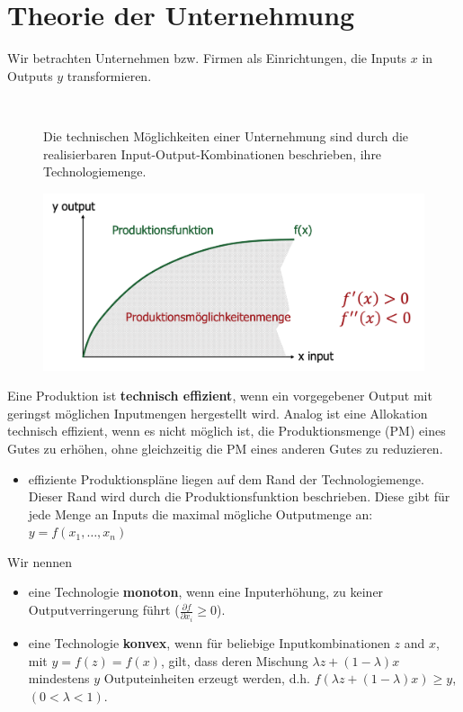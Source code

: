 \chapter{Theorie der Unternehmung}

Wir betrachten Unternehmen bzw. Firmen als Einrichtungen, die Inputs $x$ in Outputs $y$ transformieren.
\begin{figure}[htbp!]
	\begin{minipage}[t]{8cm} \vspace{0pt} ~\medskip
	
		 Die technischen Möglichkeiten einer Unternehmung sind durch die realisierbaren Input-Output-Kombinationen beschrieben, ihre Technologiemenge.
	\end{minipage}
	\hspace{0.25cm}
	\begin{minipage}[t]{4cm}\vspace{0.01pt}
		\includegraphics[scale=0.225]{img/technologiemenge}
	\end{minipage}
\end{figure} 

Eine Produktion ist \textbf{technisch effizient}, wenn ein vorgegebener Output mit geringst möglichen Inputmengen hergestellt wird. Analog ist eine Allokation technisch effizient, wenn es nicht möglich ist, die Produktionsmenge (PM) eines Gutes zu erhöhen, ohne gleichzeitig die PM eines anderen Gutes zu reduzieren.

\begin{itemize}
	\item effiziente Produktionspläne liegen auf dem Rand der Technologiemenge. Dieser Rand wird durch die Produktionsfunktion beschrieben. Diese gibt für jede Menge an Inputs die maximal mögliche Outputmenge an: $y = f(x_1, \dotsc, x_n)$
\end{itemize}

Wir nennen
\begin{itemize}
	\item eine Technologie \textbf{monoton}, wenn eine Inputerhöhung, zu keiner Outputverringerung führt ($\frac{\partial f}{\partial x_i} \geq 0$).
	\item eine Technologie \textbf{konvex}, wenn für beliebige Inputkombinationen $z$ and $x$, mit $y = f(z) = f(x)$, gilt, dass deren Mischung $\lambda z + (1-\lambda) x$ mindestens $y$ Outputeinheiten erzeugt werden, d.h. $f(\lambda z + (1-\lambda)x) \geq y$, $(0 < \lambda < 1)$.
\end{itemize}

